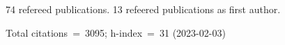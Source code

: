 74 refereed publications. 13 refeered publications as first author.

Total citations~=~3095; h-index~=~31 (2023-02-03)